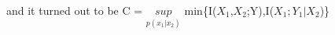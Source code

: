 \documentclass[preview]{standalone}
\begin{document}
\begin{center}
and it turned out to be C = $\underset{p(x_1|x_2)}{sup}$ min\{I($X_1$,$X_2$;Y),I($X_1;Y_1|X_2$)\}
\end{center}
\end{document}
